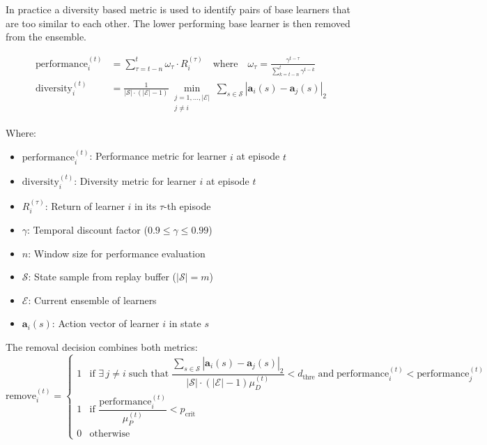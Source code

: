 In practice a diversity based metric is used to identify pairs of base learners that are too similar to each other. The lower performing base learner is then removed from the ensemble.


\begin{align*}
    \text{performance}_i^{(t)} &= \sum_{\tau=t-n}^{t} \omega_\tau \cdot R_i^{(\tau)} 
    \quad \text{where} \quad 
    \omega_\tau = \frac{\gamma^{t-\tau}}{\sum_{k=t-n}^{t} \gamma^{t-k}} \\
    \text{diversity}_i^{(t)} &= \frac{1}{|\mathcal{S}| \cdot (|\mathcal{E}|-1)} 
    \min_{\substack{j=1, ..., |\mathcal{E}| \\ j \neq i}} \sum_{s \in \mathcal{S}}  
    \left| \bm{a}_i(s) - \bm{a}_j(s) \right|_2
\end{align*}


Where:
\begin{itemize}
    \item $\text{performance}_i^{(t)}$: Performance metric for learner $i$ at episode $t$
    \item $\text{diversity}_i^{(t)}$: Diversity metric for learner $i$ at episode $t$
    \item $R_i^{(\tau)}$: Return of learner $i$ in its $\tau$-th episode 
    \item $\gamma$: Temporal discount factor ($0.9 \leq \gamma \leq 0.99$)
    \item $n$: Window size for performance evaluation
    \item $\mathcal{S}$: State sample from replay buffer ($|\mathcal{S}| = m$)
    \item $\mathcal{E}$: Current ensemble of learners
    \item $\bm{a}_i(s)$: Action vector of learner $i$ in state $s$
\end{itemize}

The removal decision combines both metrics:
\begin{equation*}
    \text{remove}_i^{(t)} = 
    \begin{cases} 
        1 & \text{if } \exists\, j \neq i \;\text{such that}\; \dfrac{\sum_{s \in \mathcal{S}}  
    \left| \bm{a}_i(s) - \bm{a}_j(s) \right|_2}{|\mathcal{S}| \cdot (|\mathcal{E}|-1)\mu_D^{(t)}} < d_{\text{thre}} \;\text{and}\; \text{performance}_i^{(t)} < \text{performance}_j^{(t)} \\
        1 & \text{if } \dfrac{\text{performance}_i^{(t)}}{\mu_P^{(t)}} < p_{\text{crit}} \\
        0 & \text{otherwise}
    \end{cases}
\end{equation*}

